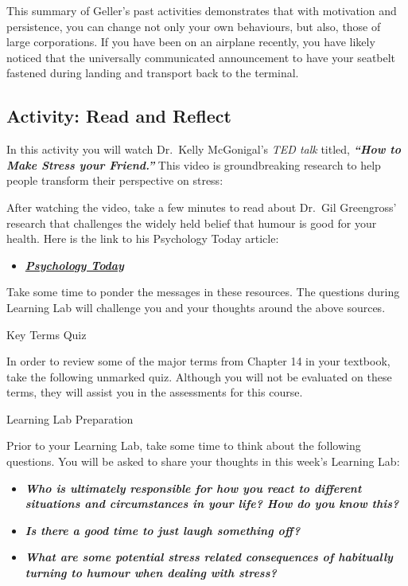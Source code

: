 \documentclass[
]{book}
\providecommand{\tightlist}{%
  \setlength{\itemsep}{0pt}\setlength{\parskip}{0pt}}
\begin{document}
This summary of Geller's past activities demonstrates that with motivation and persistence, you can change not only your own behaviours, but also, those of large corporations. If you have been on an airplane recently, you have likely noticed that the universally communicated announcement to have your seatbelt fastened during landing and transport back to the terminal.

\hypertarget{activity-read-and-reflect-14}{%
\subsection*{Activity: Read and Reflect}\label{activity-read-and-reflect-14}}

\begin{reflect}
In this activity you will watch Dr.~Kelly McGonigal's \emph{TED talk} titled, \textbf{\emph{``How to Make Stress your Friend.''}} This video is groundbreaking research to help people transform their perspective on stress:

After watching the video, take a few minutes to read about Dr.~Gil Greengross' research that challenges the widely held belief that humour is good for your health. Here is the link to his Psychology Today article:

\begin{itemize}
\tightlist
\item
  \href{https://www.psychologytoday.com/intl/blog/humor-sapiens/201805/humor-may-not-be-so-good-your-health}{\textbf{\emph{Psychology Today}}}
\end{itemize}

Take some time to ponder the messages in these resources. The questions during Learning Lab will challenge you and your thoughts around the above sources.

{Key Terms Quiz}

In order to review some of the major terms from Chapter 14 in your textbook, take the following unmarked quiz. Although you will not be evaluated on these terms, they will assist you in the assessments for this course.

{Learning Lab Preparation}

Prior to your Learning Lab, take some time to think about the following questions. You will be asked to share your thoughts in this week's Learning Lab:

\begin{itemize}
\tightlist
\item
  \textbf{\emph{Who is ultimately responsible for how you react to different situations and circumstances in your life? How do you know this?}}\\
\item
  \textbf{\emph{Is there a good time to just laugh something off?}}\\
\item
  \textbf{\emph{What are some potential stress related consequences of habitually turning to humour when dealing with stress?}}
\end{itemize}
\end{reflect}
\end{document}

